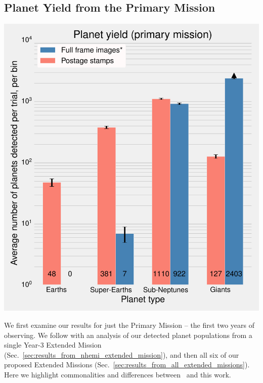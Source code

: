 \subsection{Planet Yield from the Primary Mission}
\label{sec:results_from_primary_missions}
\begin{marginfigure} %
	\centering
	\includegraphics[width=\textwidth]{figures/160729_pm0_shemi_nhemi_nhemi_t20-pri-yield.pdf}
	\caption{Mean numbers of planets detected in \tesss Primary Mission.
	The number of Earths ($R_p < 1.25R_\oplus$), super-Earths ($1.25R_\oplus \le R_p < 2R_\oplus$), sub-Neptunes ($2R_\oplus \le R_p < 4R_\oplus$) and giants agree with the respective values quoted in \protect\citet{Sullivan_2015} to $\lesssim 50\%$. 
	Our full frame images detections are complete for $R_p < 4R_\oplus$, and 
	incomplete for giant ($R_p > 4R_\oplus$) planets, shown with a lower limit 
	(see text for discussion). 
	Error bars are from only Poisson fluctuations and do not account for systematic uncertainty.}
	\label{fig:primary_planet_yield}
\end{marginfigure}
We first examine our results for just the Primary Mission -- the first two years of \tesss observing. 
We follow with an analysis of our detected planet populations from a single Year-3 Extended Mission (Sec.~\ref{sec:results_from_nhemi_extended_mission}), and then all six of our proposed Extended Missions (Sec.~\ref{sec:results_from_all_extended_missions}).
Here we highlight commonalities and differences between~ and this work.

